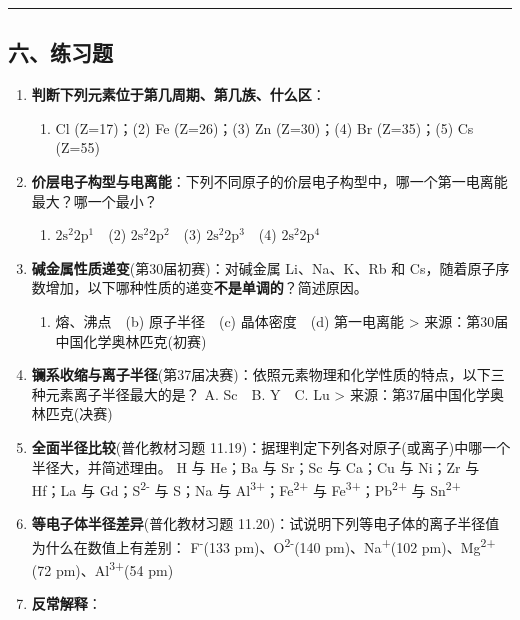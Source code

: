\documentclass[a4paper,11pt]{ctexart}
\providecommand{\tightlist}{\setlength{\itemsep}{0pt}\setlength{\parskip}{0pt}}
\newcommand{\箭}{\ensuremath{\rightarrow}}
\newcommand{\左箭}{\ensuremath{\leftarrow}}
\newcommand{\上箭}{\ensuremath{\uparrow}}
\newcommand{\下箭}{\ensuremath{\downarrow}}
\newcommand{\衡}{\ensuremath{\rightleftharpoons}}
\newcommand{\双箭}{\ensuremath{\leftrightarrow}}
\newcommand{\约等于}{\ensuremath{\approx}}
\newcommand{\小于等于}{\ensuremath{\leq}}
\newcommand{\大于等于}{\ensuremath{\geq}}
\newcommand{\不等于}{\ensuremath{\neq}}
\newcommand{\西格马}{\ensuremath{\sigma}}
\newcommand{\派}{\ensuremath{\pi}}
\begin{document}
\begin{center}\rule{0.5\linewidth}{0.5pt}\end{center}

\subsection{六、练习题}\label{ux516dux7ec3ux4e60ux9898}

\begin{enumerate}
\def\labelenumi{\arabic{enumi}.}
\item
  \textbf{判断下列元素位于第几周期、第几族、什么区}：

  \begin{enumerate}
  \def\labelenumii{(\arabic{enumii})}
  \tightlist
  \item
    Cl (Z=17)；(2) Fe (Z=26)；(3) Zn (Z=30)；(4) Br (Z=35)；(5) Cs (Z=55)
  \end{enumerate}
\item
  \textbf{价层电子构型与电离能}：下列不同原子的价层电子构型中，哪一个第一电离能最大？哪一个最小？

  \begin{enumerate}
  \def\labelenumii{(\arabic{enumii})}
  \tightlist
  \item
    \(2\mathrm{s}^2 2\mathrm{p}^1\)　(2) \(2\mathrm{s}^2 2\mathrm{p}^2\)　(3) \(2\mathrm{s}^2 2\mathrm{p}^3\)　(4) \(2\mathrm{s}^2 2\mathrm{p}^4\)
  \end{enumerate}
\item
  \textbf{碱金属性质递变}(第30届初赛)：对碱金属 Li、Na、K、Rb 和 Cs，随着原子序数增加，以下哪种性质的递变\textbf{不是单调的}？简述原因。

  \begin{enumerate}
  \def\labelenumii{(\alph{enumii})}
  \tightlist
  \item
    熔、沸点　(b) 原子半径　(c) 晶体密度　(d) 第一电离能
    \textgreater{} 来源：第30届中国化学奥林匹克(初赛)
  \end{enumerate}
\item
  \textbf{镧系收缩与离子半径}(第37届决赛)：依照元素物理和化学性质的特点，以下三种元素离子半径最大的是？
  A. Sc　B. Y　C. Lu
  \textgreater{} 来源：第37届中国化学奥林匹克(决赛)
\item
  \textbf{全面半径比较}(普化教材习题 11.19)：据理判定下列各对原子(或离子)中哪一个半径大，并简述理由。
  H 与 He；Ba 与 Sr；Sc 与 Ca；Cu 与 Ni；Zr 与 Hf；La 与 Gd；S\textsuperscript{2-} 与 S；Na 与 Al\textsuperscript{3+}；Fe\textsuperscript{2+} 与 Fe\textsuperscript{3+}；Pb\textsuperscript{2+} 与 Sn\textsuperscript{2+}
\item
  \textbf{等电子体半径差异}(普化教材习题 11.20)：试说明下列等电子体的离子半径值为什么在数值上有差别：
  F\textsuperscript{-}(133 pm)、O\textsuperscript{2-}(140 pm)、Na\textsuperscript{+}(102 pm)、Mg\textsuperscript{2+}(72 pm)、Al\textsuperscript{3+}(54 pm)
\item
  \textbf{反常解释}：


\end{enumerate}
\end{document}
